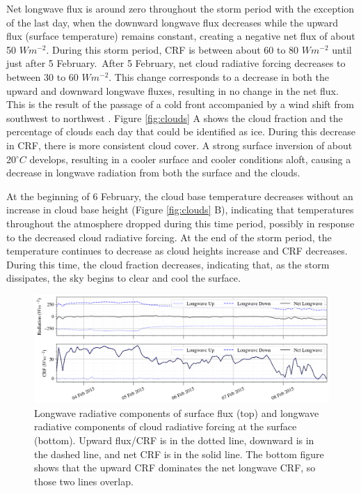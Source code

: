 Net longwave flux is around zero throughout the storm period with the exception of the last day, when the downward longwave flux decreases while the upward flux (surface temperature) remains constant, creating a negative net flux of about 50 $Wm^{-2}$. During this storm period, CRF is between about 60 to 80 $Wm^{-2}$ until just after 5 February. After 5 February, net cloud radiative forcing decreases to between 30 to 60 $Wm^{-2}$. This change corresponds to a decrease in both the upward and downward longwave fluxes, resulting in no change in the net flux. This is the result of the passage of a cold front accompanied by a wind shift from southwest to northwest \citep{kayser:2017}. Figure \ref{fig:clouds} A shows the cloud fraction and the percentage of clouds each day that could be identified as ice. During this decrease in CRF, there is more consistent cloud cover. A strong surface inversion of about 20$^{\circ}C$ develops, resulting in a cooler surface and cooler conditions aloft, causing a decrease in longwave radiation from both the surface and the clouds. 

At the beginning of 6 February, the cloud base temperature decreases without an increase in cloud base height (Figure \ref{fig:clouds} B), indicating that temperatures throughout the atmosphere dropped during this time period, possibly in response to the decreased cloud radiative forcing. At the end of the storm period, the temperature continues to decrease as cloud heights increase and CRF decreases. During this time, the cloud fraction decreases, indicating that, as the storm dissipates, the sky begins to clear and cool the surface. 

\begin{figure}[h]
    \centering
    \includegraphics[width=1\linewidth]{figures/chapter4/CloudSummary_LW_M2.png}
    \caption[Longwave radiative components of flux and cloud radiative forcing]{Longwave radiative components of surface flux (top) and longwave radiative components of cloud radiative forcing at the surface (bottom). Upward flux/CRF is in the dotted line, downward is in the dashed line, and net CRF is in the solid line. The bottom figure shows that the upward CRF dominates the net longwave CRF, so those two lines overlap.}
    \label{fig:flux}
\end{figure}

